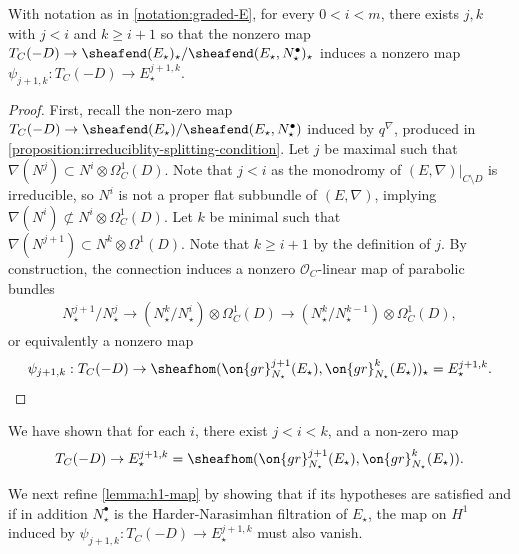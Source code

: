 \begin{lemma}
\notready
	\label{lemma:nonzero-induced-connection}
	With notation as in \autoref{notation:graded-E},
	for every $0 < i < m$, there exists $j,k$ with $j < i$ and $k \geq
	i + 1$ so that the nonzero map $T_C(-D)\to
	\sheafend(E_\star)_\star/\sheafend(E_\star, N^\bullet_\star)_\star$ induces a nonzero map
$\psi_{j+1, k}: T_C(-D)\to E_\star^{j+1,k}$.
\end{lemma}
\begin{proof}
	First, recall the non-zero map
$T_C(-D)\to
\sheafend(E_\star)/\sheafend(E_\star,N_\star^\bullet)$ induced by $q^\nabla$, produced  in
	\autoref{proposition:irreduciblity-splitting-condition}.
Let $j$ be maximal such that $\nabla(N^j)\subset N^i\otimes \Omega^1_C(D)$.
Note that $j< i$ as the monodromy of $(E,\nabla)|_{C\setminus D}$ is irreducible, so $N^i$ is
not a proper flat subbundle of $(E, \nabla)$, implying $\nabla(N^i) \not \subset
N^i\otimes \Omega^1_C(D)$.
Let $k$ be minimal such that $\nabla(N^{j+1})\subset N^k\otimes\Omega^1(D)$.
Note that $k\geq i+1$ by the definition of $j$.
By construction, the connection induces a nonzero $\mathscr{O}_C$-linear map of parabolic bundles
\begin{align*}
	N_\star^{j+1}/N_\star^j  \to (N_\star^k/N_\star^{i}) \otimes
\Omega_C^1(D)\to (N_\star^k/N_\star^{k-1}) \otimes
\Omega_C^1(D),
\end{align*}
or equivalently a nonzero map
\[\psi_{j+1, k}: T_C(-D) \to \sheafhom(\on{gr}^{j+1}_{N_\star}(E_\star),
\on{gr}^k_{N_\star}(E_\star))_\star = E_\star^{j+1,k}.\qedhere\]
\end{proof}

We have shown that for each $i$, there exist $j<i< k$, and a non-zero map $$T_C(-D)\to E_\star^{j+1,k} =
\sheafhom(\on{gr}^{j+1}_{N_\star}(E_\star),
\on{gr}^{k}_{N_\star}(E_\star)).$$

We next refine \autoref{lemma:h1-map} by showing that if its hypotheses are satisfied and if in addition $N_\star^\bullet$ is the Harder-Narasimhan filtration of $E_\star$, the  map on $H^1$
induced by
$\psi_{j+1, k}: T_C(-D)\to E_\star^{j+1,k}$
must also vanish.


